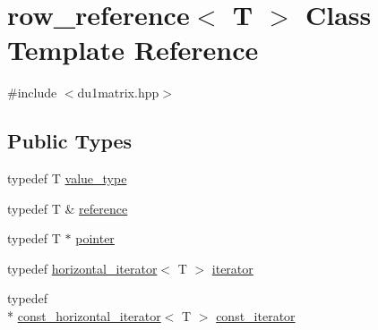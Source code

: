 \hypertarget{classrow__reference}{\section{row\-\_\-reference$<$ T $>$ Class Template Reference}
\label{classrow__reference}
}


{\ttfamily \#include $<$du1matrix.\-hpp$>$}

\subsection*{Public Types}
\begin{DoxyCompactItemize}
\item 
typedef T \hyperlink{classrow__reference_a10c5b69f588808b43b417922795f12ce}{value\-\_\-type}
\item 
typedef T \& \hyperlink{classrow__reference_aa9bd9523fa30ad1336ad1327c011dde3}{reference}
\item 
typedef T $\ast$ \hyperlink{classrow__reference_a3f5e136cc45d10f628005e298ca0c724}{pointer}
\item 
typedef \hyperlink{classhorizontal__iterator}{horizontal\-\_\-iterator}$<$ T $>$ \hyperlink{classrow__reference_a82d976cea237ebb2ddb3be8bd810ffa8}{iterator}
\item 
typedef \\*
\hyperlink{classconst__horizontal__iterator}{const\-\_\-horizontal\-\_\-iterator}$<$ T $>$ \hyperlink{classrow__reference_a3a005e2f998d46b3718fc09c79066b5e}{const\-\_\-iterator}
\end{DoxyCompactItemize}
